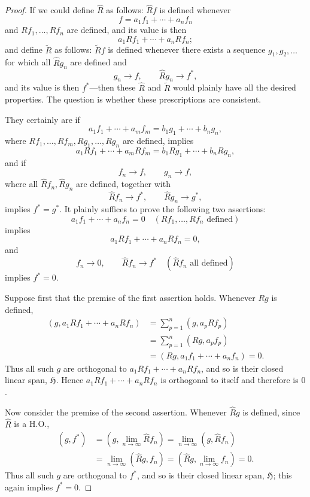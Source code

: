 ﻿\documentclass[paper=b5,fontsize=13pt,bookmarkpackage=false,twoside]{scrartcl}
\begin{document}
\begin{proof}
If we could define $\widehat R$ as follows: $\widehat Rf$ is defined whenever
\[
f=a_1f_1+\cdots+a_nf_n
\]
and $Rf_1,\ldots,Rf_n$ are defined, and its value is then
\[
a_1Rf_1+\cdots+a_nRf_n;
\]
and define $\widetilde R$ as follows: $\widetilde Rf$ is defined whenever there exists a sequence $g_1,g_2,\ldots$ for which all $\widehat Rg_n$ are defined and
\[
g_n\longrightarrow f,\qquad \widehat Rg_n\longrightarrow f^*,
\]
and its value is then $f^*$---then these $\widehat R$ and $\widetilde R$ would plainly have all the desired properties. The question is whether these prescriptions are consistent.

They certainly are if
\[
a_1f_1+\cdots+a_mf_m=b_1g_1+\cdots+b_ng_n,
\]
where $Rf_1,\ldots,Rf_m,Rg_1,\ldots,Rg_n$ are defined, implies
\[
a_1Rf_1+\cdots+a_mRf_m=b_1Rg_1+\cdots+b_nRg_n,
\]
and if
\[
f_n\longrightarrow f,\qquad g_n\longrightarrow f,
\]
where all $\widehat Rf_n,\widehat Rg_n$ are defined, together with
\[
\widehat Rf_n\longrightarrow f^*,\qquad \widehat Rg_n\longrightarrow g^*,
\]
implies $f^*=g^*$. It plainly suffices to prove the following two assertions:
\[
a_1f_1+\cdots+a_nf_n=0
\quad(Rf_1,\ldots,Rf_n\text{ defined})
\]
implies
\[
a_1Rf_1+\cdots+a_nRf_n=0,
\]
and
\[
f_n\longrightarrow0,\qquad \widehat Rf_n\longrightarrow f^*
\quad(\widehat Rf_n\text{ all defined})
\]
implies $f^*=0$.

Suppose first that the premise of the first assertion holds. Whenever $Rg$ is defined,
\begin{align*}
\left(g,a_1Rf_1+\cdots+a_nRf_n\right)
 &=\sum_{p=1}^n(g,a_pRf_p)\\
 &=\sum_{p=1}^n(Rg,a_pf_p)\\
 &=\left(Rg,a_1f_1+\cdots+a_nf_n\right)=0.
\end{align*}
Thus all such $g$ are orthogonal to $a_1Rf_1+\cdots+a_nRf_n$, and so is their closed linear span, $\mathfrak H$. Hence $a_1Rf_1+\cdots+a_nRf_n$ is orthogonal to itself and therefore is $0$.

Now consider the premise of the second assertion. Whenever $\widehat Rg$ is defined, since $\widehat R$ is a H.O.,
\begin{align*}
(g,f^*)
 &=\left(g,\lim_{n\to\infty}\widehat Rf_n\right)
  =\lim_{n\to\infty}(g,\widehat Rf_n)\\
 &=\lim_{n\to\infty}(\widehat Rg,f_n)
  =\left(\widehat Rg,\lim_{n\to\infty}f_n\right)=0.
\end{align*}
Thus all such $g$ are orthogonal to $f^*$, and so is their closed linear span, $\mathfrak H$; this again implies $f^*=0$.
\end{proof}
\end{document}

